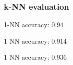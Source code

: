 \begin{frame}
	\frametitle{k-NN evaluation}
	
	\begin{center}
	\end{center}
	
	\vspace{-7.5cm}
	
	\begin{tabbing}
		\hspace*{0.7cm}
		1-NN accuracy: 0.94
	\end{tabbing}
	
	\vspace{-1.2cm}
	
	\begin{tabbing}
		\hspace*{7.1cm}
		1-NN accuracy: 0.914
	\end{tabbing}
	
	\vspace{3.7cm}
	
	\begin{tabbing}
		\hspace*{7.7cm}
		1-NN accuracy: 0.936
	\end{tabbing}
\end{frame}
